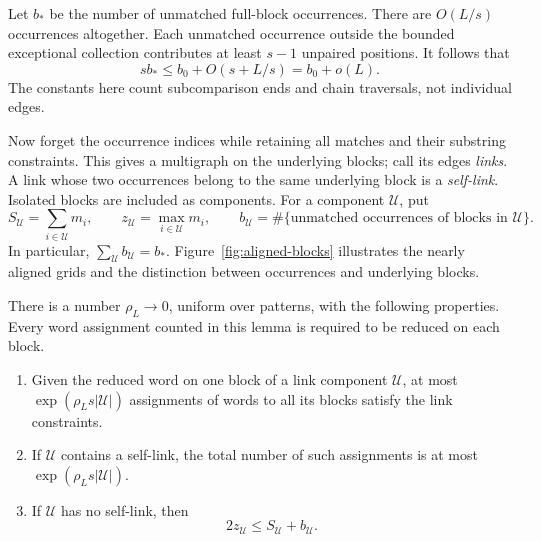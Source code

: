 Let $b_*$ be the number of unmatched full-block occurrences.
There are $O(L/s)$ occurrences altogether.  Each unmatched occurrence
outside the bounded exceptional collection contributes at least $s-1$
unpaired positions.  It follows that
\begin{equation}\label{eq:block-unmatched-budget}
 sb_*\leq b_0+O(s+L/s)=b_0+o(L).
\end{equation}
The constants here count subcomparison ends and chain traversals, not
individual edges.

Now forget the occurrence indices while retaining all matches and
their substring constraints.  This gives a multigraph on the underlying
blocks; call its edges \emph{links}.  A link whose two occurrences
belong to the same underlying block is a \emph{self-link}.  Isolated
blocks are included as components.  For a component $\mathcal U$, put
\begin{equation}\label{eq:link-component-parameters}
 S_{\mathcal U}=\sum_{i\in\mathcal U}m_i,\qquad
 z_{\mathcal U}=\max_{i\in\mathcal U}m_i,\qquad
 b_{\mathcal U}=\#\{\text{unmatched occurrences of blocks in }
 \mathcal U\}.
\end{equation}
In particular, $\sum_{\mathcal U}b_{\mathcal U}=b_*$.
Figure~\ref{fig:aligned-blocks} illustrates the nearly aligned grids
and the distinction between occurrences and underlying blocks.



\begin{lemma}\label{lem:link-word-counts}
There is a number $\rho_L\to0$, uniform over patterns, with the following
properties.  Every word assignment counted in this lemma is required
to be reduced on each block.
\begin{enumerate}
 \item Given the reduced word on one block of a link component
 $\mathcal U$, at most $\exp(\rho_Ls|\mathcal U|)$ assignments of
 words to all its blocks satisfy the link constraints.
 \item If $\mathcal U$ contains a self-link, the total number of such
 assignments is at most $\exp(\rho_Ls|\mathcal U|)$.
 \item If $\mathcal U$ has no self-link, then
 \begin{equation}\label{eq:component-multiplicity}
  2z_{\mathcal U}\leq S_{\mathcal U}+b_{\mathcal U}.
 \end{equation}
\end{enumerate}
\end{lemma}

